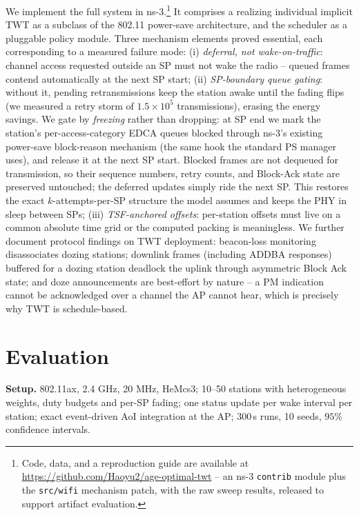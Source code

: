 We implement the full system in ns-3.\footnote{Code, data, and a
reproduction guide are available at
\url{https://github.com/Haoyu2/age-optimal-twt} -- an ns-3 \texttt{contrib}
module plus the \texttt{src/wifi} mechanism patch, with the raw sweep results,
released to support artifact evaluation.} It comprises a
\TwtPSM{}
realizing individual implicit TWT as a subclass of the 802.11 power-save
architecture, and the scheduler as a pluggable policy module. Three
mechanism elements proved essential, each corresponding to a measured
failure mode:
(i) \emph{deferral, not wake-on-traffic}: channel access requested outside
an SP must not wake the radio -- queued frames contend automatically at the
next SP start;
(ii) \emph{SP-boundary queue gating}: without it, pending retransmissions
keep the station awake until the fading flips (we measured a retry storm of
$1.5\times10^5$ transmissions), erasing the energy savings. We gate by
\emph{freezing} rather than dropping: at SP end we mark the station's
per-access-category EDCA queues blocked through ns-3's existing power-save
block-reason mechanism (the same hook the standard PS manager uses), and
release it at the next SP start. Blocked frames are not dequeued for
transmission, so their sequence numbers, retry counts, and Block-Ack state
are preserved untouched; the deferred updates simply ride the next SP. This
restores the exact $k$-attempts-per-SP structure the model assumes and keeps
the PHY in sleep between SPs;
(iii) \emph{TSF-anchored offsets}: per-station offsets must live on a common
absolute time grid or the computed packing is meaningless.
We further document protocol findings on TWT deployment: beacon-loss
monitoring disassociates dozing stations; downlink frames (including
ADDBA responses) buffered for a dozing station deadlock the uplink through
asymmetric Block Ack state; and doze announcements are best-effort by
nature -- a PM indication cannot be acknowledged over a channel the AP
cannot hear, which is precisely why TWT is schedule-based.

\section{Evaluation}
\label{sec:evaluation}

\textbf{Setup.} 802.11ax, 2.4 GHz, 20 MHz, HeMcs3; 10--50 stations with
heterogeneous weights, duty budgets and per-SP fading; one status update
per wake interval per station; exact event-driven AoI integration at the AP;
$300$\,s runs, 10 seeds, $95\%$ confidence intervals.

